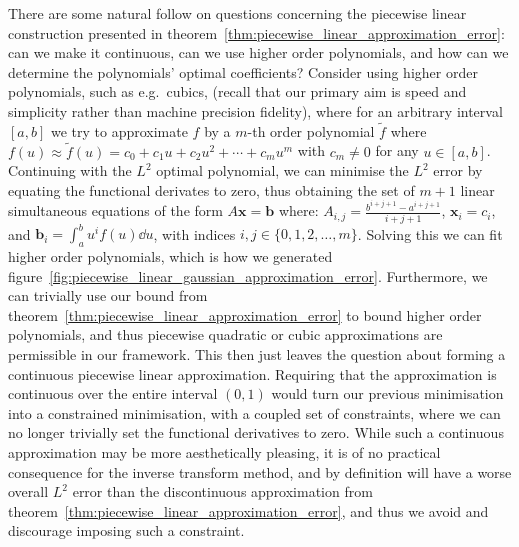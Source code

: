 \documentclass[manuscript,review]{acmart}
\begin{document}
There are some natural follow on questions concerning the piecewise linear construction presented in theorem~\ref{thm:piecewise_linear_approximation_error}: can we make it continuous, can we use higher order polynomials, and how can we determine the polynomials' optimal coefficients? Consider using higher order polynomials, such as e.g.\ cubics, (recall that our primary aim is speed and simplicity rather than machine precision fidelity), where for an arbitrary interval $ [a,b] $ we try to approximate $ f $ by a $ m $-th order polynomial $ \widetilde{f} $ where $ f(u) \approx \widetilde{f}(u) = c_0 + c_1 u + c_2 u^2 + \cdots + c_m u^m $ with $ c_m \neq 0 $ for any $ u \in [a,b] $. Continuing with the $ L^2 $ optimal polynomial, we can minimise the $ L^2 $ error by equating the functional derivates to zero, thus obtaining the set of $ m + 1 $ linear simultaneous equations of the form $ A\bm{x} = \bm{b} $ where: $ A_{i,j} = \tfrac{b^{i+j+1} - a^{i+j+1}}{i+j+1} $, $ \bm{x}_i = c_i $, and $ \bm{b}_{i} = \int_{a}^{b} u^i f(u) \dd{u} $, with indices $ i,j \in \{0,1,2,\ldots,m\} $. Solving this we can fit higher order polynomials, which is how we generated figure~\ref{fig:piecewise_linear_gaussian_approximation_error}. Furthermore, we can trivially use our bound from theorem~\ref{thm:piecewise_linear_approximation_error} to bound higher order polynomials, and thus piecewise quadratic or cubic approximations are permissible in our framework. This then just leaves the question about forming a continuous piecewise linear approximation. Requiring that the approximation is continuous over the entire interval $ (0, 1) $ would turn our previous minimisation into a constrained minimisation, with a coupled set of constraints, where we can no longer trivially set the functional derivatives to zero.  While such a continuous approximation may be more aesthetically pleasing, it is of no practical consequence for the inverse transform method, and by definition will have a worse overall $ L^2 $ error than the discontinuous approximation from theorem~\ref{thm:piecewise_linear_approximation_error}, and thus we avoid and discourage imposing such a constraint. 
\end{document}
